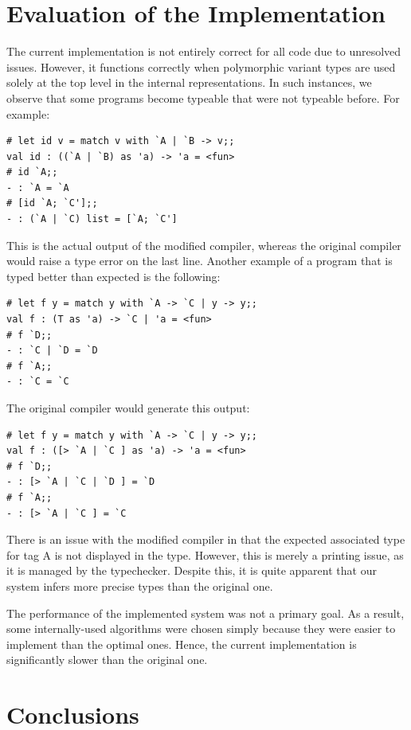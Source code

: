 \documentclass[a4paper,11pt,oneside]{article}
\theoremstyle{definition}
\begin{document}
\section{Evaluation of the Implementation}

The current implementation is not entirely correct for all code due to unresolved issues. However, it functions correctly when polymorphic variant types are used solely at the top level in the internal representations. In such instances, we observe that some programs become typeable that were not typeable before. For example:

{\ttfamily\begin{verbatim}
# let id v = match v with `A | `B -> v;;
val id : ((`A | `B) as 'a) -> 'a = <fun>
# id `A;;
- : `A = `A
# [id `A; `C'];;
- : (`A | `C) list = [`A; `C']
\end{verbatim}}

This is the actual output of the modified compiler, whereas the original compiler would raise a type error on the last line. Another example of a program that is typed better than expected is the following:

{\ttfamily\begin{verbatim}
# let f y = match y with `A -> `C | y -> y;;
val f : (T as 'a) -> `C | 'a = <fun>
# f `D;;
- : `C | `D = `D
# f `A;;
- : `C = `C
\end{verbatim}}

The original compiler would generate this output:

{\ttfamily\begin{verbatim}
# let f y = match y with `A -> `C | y -> y;;
val f : ([> `A | `C ] as 'a) -> 'a = <fun>
# f `D;;
- : [> `A | `C | `D ] = `D
# f `A;;
- : [> `A | `C ] = `C
\end{verbatim}}

There is an issue with the modified compiler in that the expected associated type for tag A is not displayed in the type. However, this is merely a printing issue, as it is managed by the typechecker. Despite this, it is quite apparent that our system infers more precise types than the original one.

The performance of the implemented system was not a primary goal. As a result, some internally-used algorithms were chosen simply because they were easier to implement than the optimal ones. Hence, the current implementation is significantly slower than the original one.

\section{Conclusions}
\end{document}
